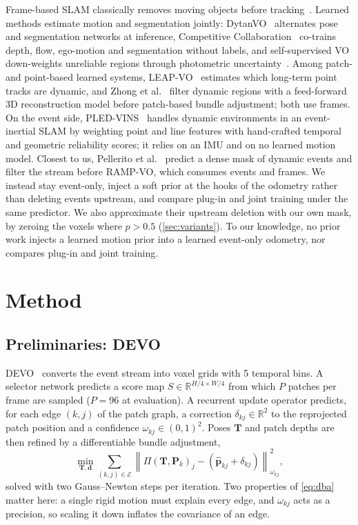 \documentclass[conference]{IEEEtran}
\renewcommand{\mathbb}[1]{\mathds{#1}}
\begin{document}
Frame-based SLAM classically removes moving objects before
tracking~\cite{bescos2018dynaslam}. Learned methods estimate motion and segmentation
jointly: DytanVO~\cite{shen2023dytanvo} alternates pose and segmentation networks at
inference, Competitive Collaboration~\cite{ranjan2019cc} co-trains depth, flow, ego-motion
and segmentation without labels, and self-supervised VO down-weights unreliable regions
through photometric uncertainty~\cite{yang2020d3vo,zhu2019unsupervised}. Among patch- and
point-based learned systems, LEAP-VO~\cite{chen2024leapvo} estimates which long-term point
tracks are dynamic, and Zhong et al.~\cite{zhong2025dynamic3dprior} filter dynamic regions
with a feed-forward 3D reconstruction model before patch-based bundle adjustment; both use
frames. On the event side, PLED-VINS~\cite{lee2026pledvins} handles dynamic environments in
an event-inertial SLAM by weighting point and line features with hand-crafted temporal and
geometric reliability scores; it relies on an IMU and on no learned motion model. Closest
to us, Pellerito et al.~\cite{pellerito2026suppression} predict a dense mask of dynamic
events and filter the stream before RAMP-VO, which consumes events and frames. We instead
stay event-only, inject a soft prior at the hooks of the odometry rather than deleting
events upstream, and compare plug-in and joint training under the same predictor. We also
approximate their upstream deletion with our own mask, by zeroing the voxels where
$p > 0.5$ (\cref{sec:variants}). To our knowledge, no prior work injects a learned motion
prior into a learned event-only odometry, nor compares plug-in and joint training.

\section{Method}

\subsection{Preliminaries: DEVO}

DEVO~\cite{klenk2024devo} converts the event stream into voxel grids with 5 temporal bins.
A selector network predicts a score map $S \in \mathbb{R}^{H/4 \times W/4}$ from which $P$
patches per frame are sampled ($P = 96$ at evaluation). A recurrent update operator
predicts, for each edge $(k, j)$ of the patch graph, a correction
$\delta_{kj} \in \mathbb{R}^2$ to the reprojected patch position and a confidence
$\omega_{kj} \in (0, 1)^2$. Poses $\mathbf{T}$ and patch depths are then refined by a
differentiable bundle adjustment,
\begin{equation}
\min_{\mathbf{T}, \mathbf{d}} \sum_{(k, j) \in \mathcal{E}}
\left\| \Pi(\mathbf{T}, \mathbf{P}_k)_j - \left(\hat{\mathbf{p}}_{kj} + \delta_{kj}\right) \right\|^2_{\omega_{kj}},
\label{eq:dba}
\end{equation}
solved with two Gauss--Newton steps per iteration. Two properties of \cref{eq:dba} matter
here: a single rigid motion must explain every edge, and $\omega_{kj}$ acts as a
precision, so scaling it down inflates the covariance of an edge.
\end{document}
